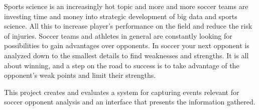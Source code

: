 Sports science is an increasingly hot topic and more and more soccer teams are investing time and money into strategic development of big data and sports science. All this to increase player’s performance on the field and reduce the risk of injuries. Soccer teams and athletes in general are constantly looking for possibilities to gain advantages over opponents. In soccer your next opponent is analyzed down to the smallest details to find weaknesses and strengths. It is all about winning, and a step on the road to success is to take advantage of the opponent’s weak points and limit their strengths.

This project creates and evaluates a system for capturing events relevant for soccer opponent analysis and an interface that presents the information gathered.





